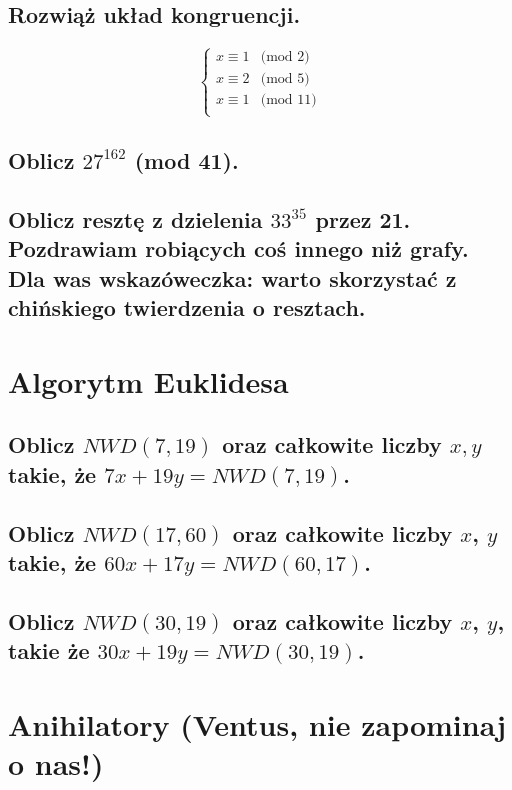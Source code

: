 \documentclass[12pt]{article}
\begin{document}
\subsection{Rozwiąż układ kongruencji.}

$$
\left\{ \begin{array}{ll}
x \equiv 1 & \textrm{(mod 2)}\\
x \equiv 2 & \textrm{(mod 5)}\\
x \equiv 1 & \textrm{(mod 11)}\\
\end{array} \right.
$$

\subsection{Oblicz $27^{162}$ (mod 41).}

\subsection{Oblicz resztę z dzielenia $33^{35}$ przez 21. Pozdrawiam robiących coś innego niż grafy. Dla was wskazóweczka: warto skorzystać z chińskiego twierdzenia o resztach.}

\section{Algorytm Euklidesa}

\subsection{Oblicz $NWD(7, 19)$ oraz całkowite liczby $x,y$ takie, że $7x + 19y = NWD(7, 19)$.}

\subsection{Oblicz $NWD(17, 60)$ oraz całkowite liczby $x$, $y$ takie, że $60x + 17y = NWD(60, 17)$.}

\subsection{Oblicz $NWD(30,19)$ oraz całkowite liczby $x$, $y$, takie że $30x+19y=NWD(30,19)$.}

\section{Anihilatory (Ventus, nie zapominaj o nas!)}
\end{document}
